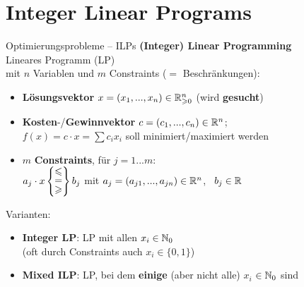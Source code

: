 \section{Integer Linear Programs}

\begin{frame}{Optimierungsprobleme – ILPs}
	\textbf{(Integer) Linear Programming} \\
	Lineares Programm (LP) \\ mit $n$ Variablen und $m$ Constraints ($=$ Beschränkungen):   %
	\begin{itemize}
		\pause
		\item \textbf{Lösungsvektor} $x = (x_1, ..., x_n) \in \mathbb{R}_{\geqslant0}^n$ (wird \textbf{gesucht})
		\pause
		\item \textbf{Kosten}-/\textbf{Gewinnvektor} $c = (c_1, ..., c_n)\in \mathbb{R}^n$; \\ 
		$f(x) = c \cdot x = \sum c_i  x_i $ soll minimiert/maximiert werden
		\pause
		\item $m$ \textbf{Constraints}, \quad für $j = 1...m$: \\ \vspace{.1\baselineskip}
		\quad $a_j \cdot x \braced{\stackedtight{\leq \\ = \\ \geq}} b_j$ \quad mit $a_j = (a_{j1}, ..., a_{jn}) \in \mathbb{R}^n$, \ $b_j \in \mathbb{R}$  %
	\end{itemize}
	\pause
	Varianten:
	\begin{itemize}
		\item \textbf{Integer LP}: LP mit allen $x_i \in \mathbb{N}_0$ \\
		(oft durch Constraints auch $x_i \in \{0, 1\}$)
		\pause
		\item \textbf{Mixed ILP}: LP, bei dem \textbf{einige} (aber nicht alle) $x_i$ $\in \mathbb{N}_0$ sind
	\end{itemize}
\end{frame}

